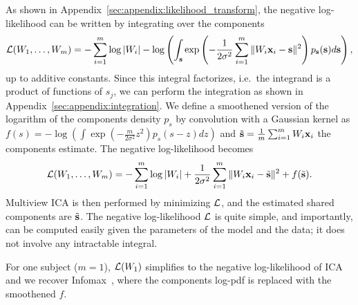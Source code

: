 \documentclass{report}
\begin{document}
As shown in Appendix~\ref{sec:appendix:likelihood_transform}, the negative log-likelihood can be written by integrating over the components
\begin{equation} 
    \label{eq:likelihood}
    \mathcal{L}(W_1, \dots, W_m) = -\sum_{i=1}^m\log|W_i| - \log\left(\int_{\mathbf{s}}\exp\left(-\frac1{2\sigma^2}\sum_{i=1}^m\|W_i\mathbf{x}_i - \mathbf{s}\|^2\right)p_{\mathbf{s}}(\mathbf{s}) d\mathbf{s} \right),
\end{equation}
up to additive constants.
%
Since this integral factorizes, i.e.\ the integrand is a product of functions of $s_j$, we can perform the integration as shown in Appendix~\ref{sec:appendix:integration}. We define a smoothened version of the logarithm of the components density $p_s$ by convolution with a Gaussian kernel as
$
    f(s)= -\log \left(\int \exp(-\frac{m}{2\sigma^2} z^2) p_s(s-z) dz\right)
$
and $\tilde{\mathbf{s}} = \frac1m\sum_{i=1}^m W_i\mathbf{x}_i$ the components estimate.
The negative log-likelihood becomes
\begin{equation}
    \label{eq:cost_function}
    \mathcal{L}(W_1, \dots, W_m) = -\sum_{i=1}^m \log|W_i| + \frac1{2\sigma^2}\sum_{i=1}^m\|W_i\mathbf{x}_i - \tilde{\mathbf{s}}\|^2 + f(\tilde{\mathbf{s}}).
\end{equation}
Multiview ICA is then performed by minimizing $\mathcal{L}$, and the estimated shared components are $\tilde{\mathbf{s}}$.
The negative log-likelihood $\mathcal{L}$ is quite simple, and importantly, can be computed easily given the parameters of the model and the data; it does not involve any intractable integral.
%

For one subject ($m=1$), $\mathcal{L}(W_1)$ simplifies to the negative log-likelihood of ICA and we recover Infomax~\cite{bell1995information,cardoso1997infomax}, where the components log-pdf is replaced with the smoothened $f$.
%
\end{document}
